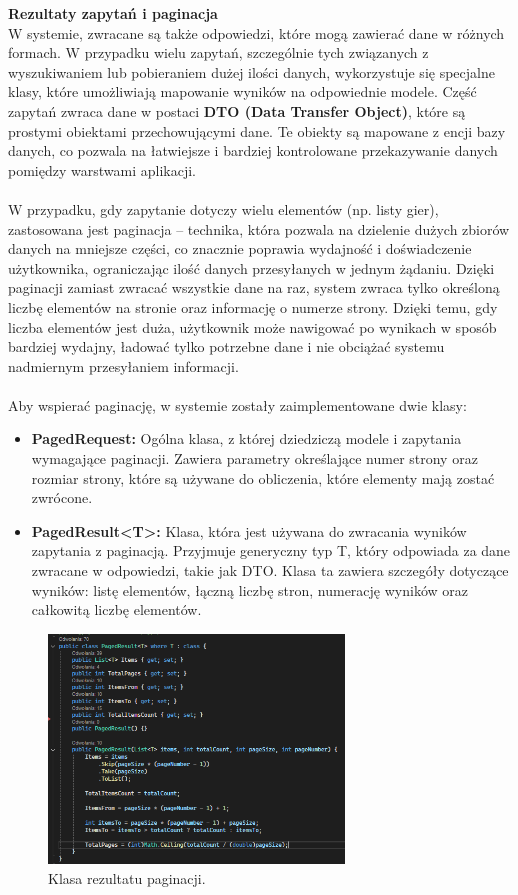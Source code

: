 \documentclass[12pt,a4paper]{article}
\begin{document}
\noindent \textbf{Rezultaty zapytań i paginacja}\\
W systemie, zwracane są także odpowiedzi, które mogą zawierać dane w różnych formach. W przypadku wielu zapytań, szczególnie tych związanych z wyszukiwaniem lub pobieraniem dużej ilości danych, wykorzystuje się specjalne klasy, które umożliwiają mapowanie wyników na odpowiednie modele. Część zapytań zwraca dane w postaci \textbf{DTO (Data Transfer Object)}, które są prostymi obiektami przechowującymi dane. Te obiekty są mapowane z encji bazy danych, co pozwala na łatwiejsze i bardziej kontrolowane przekazywanie danych pomiędzy warstwami aplikacji.
\\\\
W przypadku, gdy zapytanie dotyczy wielu elementów (np. listy gier), zastosowana jest paginacja – technika, która pozwala na dzielenie dużych zbiorów danych na mniejsze części, co znacznie poprawia wydajność i doświadczenie użytkownika, ograniczając ilość danych przesyłanych w jednym żądaniu. Dzięki paginacji zamiast zwracać wszystkie dane na raz, system zwraca tylko określoną liczbę elementów na stronie oraz informację o numerze strony. Dzięki temu, gdy liczba elementów jest duża, użytkownik może nawigować po wynikach w sposób bardziej wydajny, ładować tylko potrzebne dane i nie obciążać systemu nadmiernym przesyłaniem informacji.
\\\\
Aby wspierać paginację, w systemie zostały zaimplementowane dwie klasy:
\begin{itemize}
    \item \textbf{PagedRequest:} Ogólna klasa, z której dziedziczą modele i zapytania wymagające paginacji. Zawiera parametry określające numer strony oraz rozmiar strony, które są używane do obliczenia, które elementy mają zostać zwrócone.
    \item \textbf{PagedResult<T>:} Klasa, która jest używana do zwracania wyników zapytania z paginacją. Przyjmuje generyczny typ T, który odpowiada za dane zwracane w odpowiedzi, takie jak DTO. Klasa ta zawiera szczegóły dotyczące wyników: listę elementów, łączną liczbę stron, numerację wyników oraz całkowitą liczbę elementów.
\end{itemize}

\begin{figure}[h!]
    \centering
    \includegraphics[width=0.7\textwidth]{images/ex_pagination.png}
    \caption{Klasa rezultatu paginacji.}
\end{figure}
\end{document}
